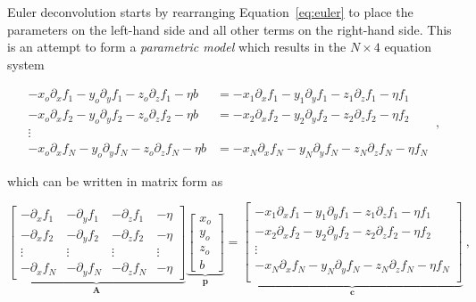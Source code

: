 Euler deconvolution starts by rearranging Equation~\ref{eq:euler} to place the
parameters on the left-hand side and all other terms on the right-hand side.
This is an attempt to form a \textit{parametric model} which results in the
$N \times 4$ equation system

\begin{equation}
  \begin{aligned}
  -x_o\partial_x f_1 - y_o\partial_y f_1 - z_o\partial_z f_1 - \eta b &= -x_1\partial_x f_1 - y_1\partial_y f_1 - z_1\partial_z f_1 - \eta f_1
  \\
  -x_o\partial_x f_2 - y_o\partial_y f_2 - z_o\partial_z f_2 - \eta b &= -x_2\partial_x f_2 - y_2\partial_y f_2 - z_2\partial_z f_2 - \eta f_2
  \\
  \vdots
  \\
  -x_o\partial_x f_N - y_o\partial_y f_N - z_o\partial_z f_N - \eta b &= -x_N\partial_x f_N - y_N\partial_y f_N - z_N\partial_z f_N - \eta f_N
  \end{aligned}
  \ ,
\end{equation}

\noindent
which can be written in matrix form as

\begin{equation}
  \underbrace{
    \begin{bmatrix}
      -\partial_x f_1 & -\partial_y f_1 & -\partial_z f_1 & -\eta \\
      -\partial_x f_2 & -\partial_y f_2 & -\partial_z f_2 & -\eta \\
      \vdots & \vdots & \vdots & \vdots \\
      -\partial_x f_N & -\partial_y f_N & -\partial_z f_N & -\eta
    \end{bmatrix}
  }_{\mathbf{A}}
  \underbrace{
    \begin{bmatrix}
      x_o \\ y_o \\ z_o \\ b
    \end{bmatrix}
  }_{\mathbf{p}}
  =
  \underbrace{
    \begin{bmatrix}
      -x_1\partial_x f_1 - y_1\partial_y f_1 - z_1\partial_z f_1 - \eta f_1 \\
      -x_2\partial_x f_2 - y_2\partial_y f_2 - z_2\partial_z f_2 - \eta f_2 \\
      \vdots \\
      -x_N\partial_x f_N - y_N\partial_y f_N - z_N\partial_z f_N - \eta f_N \\
    \end{bmatrix}
  }_{\mathbf{c}}
  \ ,
  \label{eq:deconv-system}
\end{equation}

